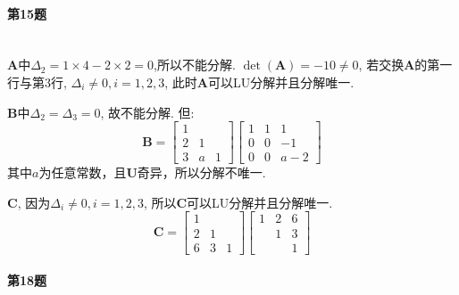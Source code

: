 \documentclass[a4paper]{article}
\begin{document}
\paragraph{第15题}~{}
\\

$\boldsymbol{A}$中$\Delta_{2}=1\times4-2\times 2=0$,所以不能分解. $\operatorname*{det}(\boldsymbol{A}) = -10 \neq 0$, 若交换$\boldsymbol{A}$的第一行与第3行, $\Delta_{i}\neq 0, i=1,2,3$, 此时$\boldsymbol{A}$可以LU分解并且分解唯一. \par
$\boldsymbol{B}$中$\Delta_{2} = \Delta_{3} = 0$, 故不能分解. 但:
\begin{equation}
    \boldsymbol{B}=\left[\begin{array}{rrr}1 & & \\ 2 & 1 & \\ 3 & a & 1\end{array}\right]\left[\begin{array}{llr}1 & 1 & 1 \\ 0 & 0 & -1 \\ 0 & 0 & a-2\end{array}\right] \nonumber
\end{equation} 
其中$a$为任意常数，且$\boldsymbol{U}$奇异，所以分解不唯一. \par
$\boldsymbol{C}$, 因为$\Delta_{i}\neq 0, i=1,2,3$, 所以$\boldsymbol{C}$可以LU分解并且分解唯一.
\begin{equation}
    \boldsymbol{C}=\left[\begin{array}{lll}1 & & \\ 2 & 1 & \\ 6 & 3 & 1\end{array}\right]\left[\begin{array}{lll}1 & 2 & 6 \\ & 1 & 3 \\ & & 1\end{array}\right] \nonumber
\end{equation}

\paragraph{第18题}~{}
\\
\end{document}
